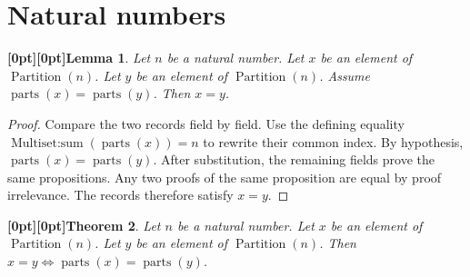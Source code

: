 \documentclass{article}
\makeatletter
\newcommand{\paperanchor}[1]{\hypertarget{#1}{}}%
\newcommand{\paperlink}[2]{\hyperlink{#1}{\begin{NoHyper}#2\end{NoHyper}}}%
\def\paperdest{\pdfextension dest}\def\paperstart{\pdfextension startlink}%
\def\paperend{\pdfextension endlink}\def\papercolor{\pdfextension colorstack}%
\let\paperdest\pdfdest\let\paperstart\pdfstartlink\let\paperend\pdfendlink\let\papercolor\pdfcolorstack
\newcommand{\paperanchor}[1]{\paperdest name{#1} xyz}%
\newcommand{\paperlink}[2]{\leavevmode\paperstart attr{/Border [0 0 0]} goto name{#1}%
      \papercolor 0 push {0.10 0.25 0.42 rg 0.10 0.25 0.42 RG}#2\papercolor 0 pop\paperend}%
\newcommand{\paperanchor}[1]{\special{pdf:dest (#1) [@thispage /XYZ null @ypos null]}}%
\newcommand{\paperlink}[2]{\leavevmode\special{pdf:bann << /Subtype /Link /Border [0 0 0] /A << /S /GoTo /D (#1) >> >>}%
      \special{color push rgb 0.10 0.25 0.42}#2\special{color pop}\special{pdf:eann}}%
\newcommand{\paperlineanchor}[1]{\raisebox{10pt}[0pt][0pt]{\paperanchor{#1}}}
\DeclareRobustCommand{\paperresultname}[1]{\paperlineanchor{theorem:\arabic{theorem}}#1}
\theoremstyle{paperresult}
\newtheorem{theorem}{\paperresultname{Theorem}}
\newcounter{paperpremise}
\newtheorem{lemma}[theorem]{\paperresultname{Lemma}}
\makeatother
\begin{document}

\section{Natural numbers}
\begin{lemma}\label{theorem:1}
Let \(n\) be a natural number. Let \(x\) be an element of \(\operatorname{Partition}\left(n\right)\). Let \(y\) be an element of \(\operatorname{Partition}\left(n\right)\). Assume \(\operatorname{parts}\left(x\right) = \operatorname{parts}\left(y\right)\). Then \(x = y\).
\end{lemma}

\begin{proof}
Compare the two records field by field. Use the defining equality \(\operatorname{Multiset\mathord{:}sum}\left(\operatorname{parts}\left(x\right)\right) = n\) to rewrite their common index. By hypothesis, \(\operatorname{parts}\left(x\right) = \operatorname{parts}\left(y\right)\). After substitution, the remaining fields prove the same propositions. Any two proofs of the same proposition are equal by proof irrelevance. The records therefore satisfy \(x = y\).
\end{proof}

\begin{theorem}\label{theorem:2}
Let \(n\) be a natural number. Let \(x\) be an element of \(\operatorname{Partition}\left(n\right)\). Let \(y\) be an element of \(\operatorname{Partition}\left(n\right)\). Then \(x = y \iff \operatorname{parts}\left(x\right) = \operatorname{parts}\left(y\right)\).
\end{theorem}
\end{document}
